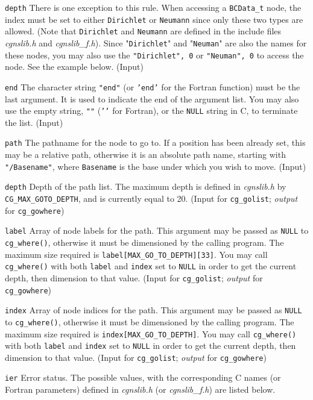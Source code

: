 \begin{Ventryi}{\texttt{depth}}
      There is one exception to this rule.
      When accessing a \texttt{BCData\_t} node, the index must be set to
      either \texttt{Dirichlet} or \texttt{Neumann} since only these
      two types are allowed.
      (Note that \texttt{Dirichlet} and \texttt{Neumann} are defined in
      the include files \textit{cgnslib.h} and \textit{cgnslib\_f.h}).
      Since "\texttt{Dirichlet}" and "\texttt{Neuman}" are also the
      names for these nodes, you may also use the \texttt{"Dirichlet", 0}
      or \texttt{"Neuman", 0} to access the node.
      See the example below.
      (\textcolor{input}{Input})
\item [\texttt{end}]
      The character string \texttt{"end"} (or \texttt{'end'} for the Fortran
      function) must be the last argument.
      It is used to indicate the end of the argument list.
      You may also use the empty string, \texttt{""} (\texttt{{'}{'}} for
      Fortran), or the \texttt{NULL} string in C, to terminate the
      list.
      (\textcolor{input}{Input})
\item [\texttt{path}]
      The pathname for the node to go to.
      If a position has been already set, this may be a relative
      path, otherwise it is an absolute path name, starting with
      \texttt{"/Basename"}, where \texttt{Basename} is the base under
      which you wish to move.
      (\textcolor{input}{Input})
\item [\texttt{depth}]
      Depth of the path list.
      The maximum depth is defined in \textit{cgnslib.h} by
      \texttt{CG\_MAX\_GOTO\_DEPTH}, and is currently equal to 20.
      (\textcolor{input}{Input} for \texttt{cg\_golist};
      \textcolor{output}{\textit{output}} for \texttt{cg\_gowhere})
\item [\texttt{label}]
      Array of node labels for the path.
      This argument may be passed as \texttt{NULL} to
      \texttt{cg\_where()}, otherwise it must be dimensioned by the
      calling program.
      The maximum size required is \texttt{label[MAX\_GO\_TO\_DEPTH][33]}.
      You may call \texttt{cg\_where()} with both \texttt{label} and
      \texttt{index} set to \texttt{NULL} in order to get the current
      depth, then dimension to that value.
      (\textcolor{input}{Input} for \texttt{cg\_golist};
      \textcolor{output}{\textit{output}} for \texttt{cg\_gowhere})
\item [\texttt{index}]
      Array of node indices for the path.
      This argument may be passed as \texttt{NULL} to
      \texttt{cg\_where()}, otherwise it must be dimensioned by the
      calling program.
      The maximum size required is \texttt{index[MAX\_GO\_TO\_DEPTH]}.
      You may call \texttt{cg\_where()} with both \texttt{label} and
      \texttt{index} set to \texttt{NULL} in order to get the current
      depth, then dimension to that value.
      (\textcolor{input}{Input} for \texttt{cg\_golist};
      \textcolor{output}{\textit{output}} for \texttt{cg\_gowhere})
\item [\texttt{ier}]
      Error status.
      The possible values, with the corresponding C names (or Fortran
      parameters) defined in \textit{cgnslib.h} (or \textit{cgnslib\_f.h})
      are listed below.


\end{Ventryi}
